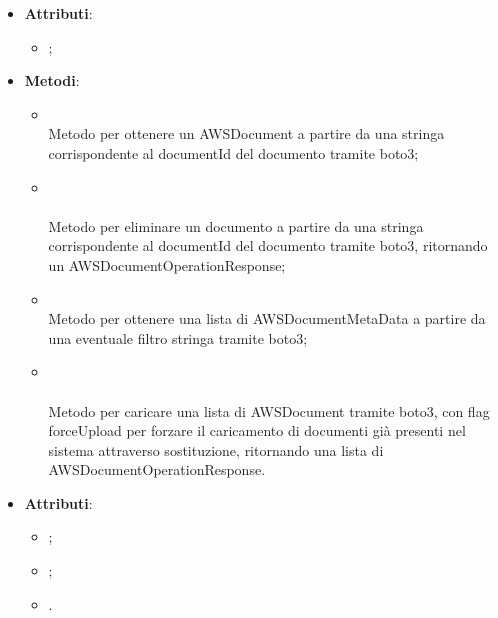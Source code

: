 \documentclass[10pt, a4paper]{article}
\begin{document}
\label{AWSS3ManagerDettaglio}
\begin{itemize}
    \item \textbf{Attributi}:
    \begin{itemize}
        \item {};
    \end{itemize}
    \item \textbf{Metodi}:
    \begin{itemize}
        \item {}\\
        Metodo per ottenere un AWSDocument a partire da una stringa corrispondente al documentId del documento tramite boto3;
        \item {}\\ \\
        Metodo per eliminare un documento a partire da una stringa corrispondente al documentId del documento tramite boto3, ritornando un AWSDocumentOperationResponse;
        \item {}\\
        Metodo per ottenere una lista di AWSDocumentMetaData a partire da una eventuale filtro stringa tramite boto3; 
        \item {}\\  \\ 
        Metodo per caricare una lista di AWSDocument tramite boto3, con flag forceUpload per forzare il caricamento di documenti già presenti nel sistema attraverso sostituzione, ritornando una lista di AWSDocumentOperationResponse.
    \end{itemize}
\end{itemize}

\label{AWSDocumentOperationResponseDettaglio}
\begin{itemize}
    \item \textbf{Attributi}:
    \begin{itemize}
        \item {};
        \item {};
        \item {}.
    \end{itemize}
\end{itemize}
\end{document}
